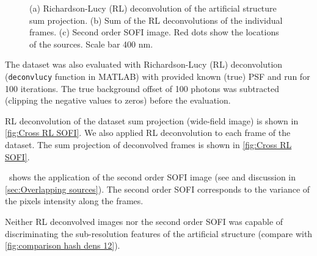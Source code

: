 \begin{figure}[!htb]
	\centering
	\newcommand{\wf}{.3\textwidth}
	\caption{(a) Richardson-Lucy (RL) deconvolution of the artificial structure sum projection.  (b) Sum of the RL deconvolutions of the individual frames. (c) Second order SOFI image. Red dots show the locations of the sources. Scale bar 400 nm.}
	\label{fig:Cross RL SOFI}
\end{figure}
%
The dataset was also evaluated with Richardson-Lucy (RL) deconvolution ({\tt deconvlucy} function in MATLAB) with provided known (true) PSF and run for 100 iterations. The true background offset of 100 photons was subtracted (clipping the negative values to zeros) before the evaluation.

RL deconvolution of the dataset sum projection (wide-field image) is shown in \autoref{fig:Cross RL SOFI}\aaa. We also applied RL deconvolution to each frame of the dataset. The sum projection of deconvolved frames is shown in \autoref{fig:Cross RL SOFI}\bbb. 

\ccc\ shows the application of the second order SOFI image (see \cite{Dertinger2010b} and discussion in \autoref{sec:Overlapping sources}). The second order SOFI corresponds to the variance of the pixels intensity along the frames. 

Neither RL deconvolved images nor the second order SOFI was capable of discriminating the sub-resolution features of the artificial structure (compare with \autoref{fig:comparison hash dens 12}).




